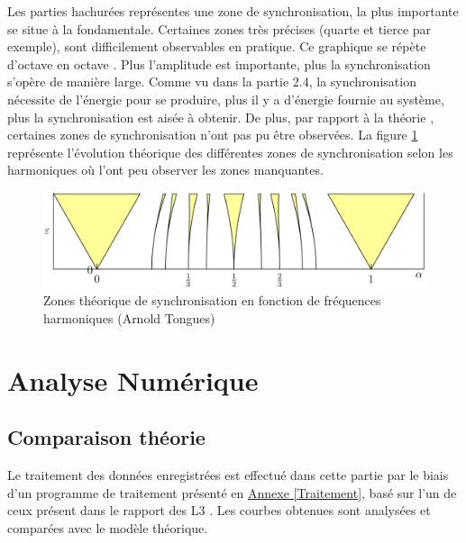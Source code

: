 \documentclass[a4paper,11pt]{report}
\begin{document}
Les parties hachurées représentes une zone de synchronisation, la plus importante se situe à la fondamentale. Certaines zones très précises (quarte et tierce par exemple), sont difficilement observables en pratique. Ce graphique se répète d'octave en octave \cite{panta}. Plus l'amplitude est importante, plus la synchronisation s'opère de manière large. Comme vu dans la partie 2.4, la synchronisation nécessite de l'énergie pour se produire, plus il y a d'énergie fournie au système, plus la synchronisation est aisée à obtenir.  De plus, par rapport à la théorie \cite{wiki}, certaines zones de synchronisation n'ont pas pu être observées. La figure \ref{ArnoldT} représente l'évolution théorique des différentes zones de synchronisation selon les harmoniques où l'ont peu observer les zones manquantes.
\begin{figure}[h]
\centering
\includegraphics[width=1\textwidth]{Arnold_tongues}
\caption{Zones théorique de synchronisation en fonction de fréquences harmoniques (Arnold Tongues)}\label{ArnoldT}
\end{figure}

\chapter{Analyse Numérique}
\section{Comparaison théorie}
Le traitement des données enregistrées est effectué dans cette partie par le biais d'un programme de traitement présenté en \underline{Annexe \ref{Traitement}}, basé sur l'un de ceux présent dans le rapport des L3 \cite{ram}. Les courbes obtenues sont analysées et comparées avec le modèle théorique.
\end{document}

